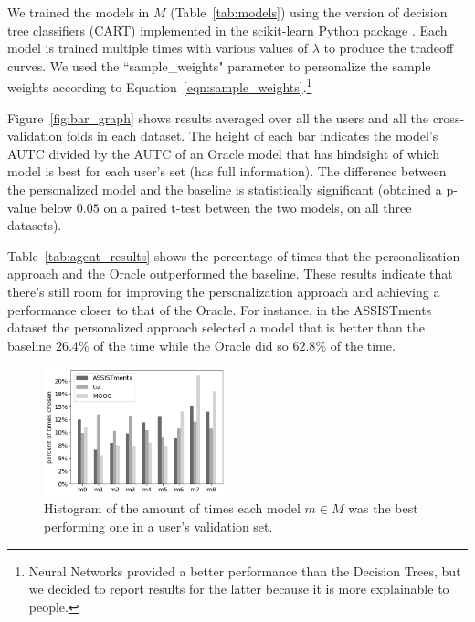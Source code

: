 \documentclass[letterpaper]{article} %
\theoremstyle{definition}
\newcommand{\kibitz}[2]{\ifnum\Comments=1{\color{#1}{#2}}\fi}
\newcommand{\ym}[1]{\kibitz{blue}{[YM:#1]}}
\newcommand{\li}[1]{\kibitz{brown}{[LL:#1]}}
\begin{document}
We trained the models in $M$ (Table~\ref{tab:models}) using the version of decision tree classifiers (CART) implemented in the scikit-learn Python package \cite{scikit-learn}. Each model is trained multiple times with various values of $\lambda$ to produce the tradeoff curves. 
We  used the ``sample\_weights" parameter to personalize the sample weights  according to Equation~\ref{eqn:sample_weights}.\footnote{Neural Networks provided a better performance than the Decision Trees, but we decided to report results for the latter because it is more explainable to people.}

Figure~\ref{fig:bar_graph} shows results averaged over all the users and all the cross-validation folds in each dataset. The height of each bar indicates the model's AUTC divided by the AUTC of an Oracle model that has hindsight of which model is best for each user's set (has full information).
The difference between the personalized model and the baseline is statistically significant (obtained a p-value below $0.05$ on a paired t-test between the two models, on all three datasets). 

Table~\ref{tab:agent_results} shows the percentage of times that the personalization approach and the Oracle outperformed the baseline. These results indicate that there's still room for improving the personalization approach and achieving a performance closer to that of the Oracle. For instance, in the ASSISTments dataset the personalized approach selected a model that is better than the baseline $26.4\%$ of the time while the Oracle did so $62.8\%$ of the time.

\begin{figure}
     \centering
     \includegraphics[width=0.47\textwidth]{model_counts}
     \caption{Histogram of the amount of times each model $m\in M$ was the best performing one in a user's validation set.}
    \label{fig:model_counts}
\end{figure}
\end{document}

